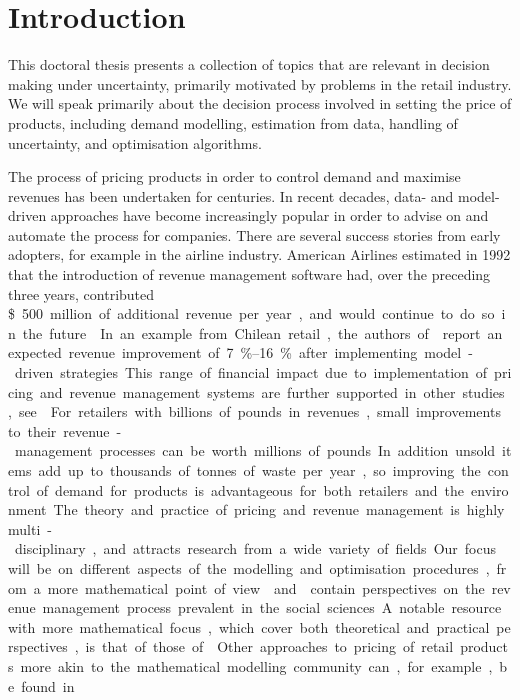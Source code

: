 \documentclass[main.tex]{subfiles}
\begin{document}
\chapter{Introduction}
This doctoral thesis presents a collection of topics that are relevant
in decision making under uncertainty, primarily motivated by
problems in the retail industry.
We will speak primarily about the decision process involved in setting the
price of products, including demand modelling, estimation from data,
handling of uncertainty, and optimisation algorithms.

The process of pricing products in order to control demand and
maximise revenues has been undertaken for centuries. In recent
decades, data- and model-driven approaches have become increasingly
popular in order to advise on and automate the process for companies.
There are several success stories from early adopters, for example in
the airline industry.
American Airlines estimated in 1992 that the introduction of revenue
management software had, over the preceding three
years, contributed \SI{500}[\$] million of additional revenue per year,
and would continue to do so in the future~\cite{smith1992yield}.
In an example from Chilean retail, the authors of~\cite{bitran1998coordinating}
report an expected revenue improvement of \SIrange{7}{16}{\percent} after implementing
model-driven strategies.
This range of financial impact due to implementation of pricing and revenue
management systems are further supported in other studies, see \cite[Ch.~1.2]{phillips2005pricing}.
For retailers with billions of pounds in revenues, small
improvements to their revenue-management processes can be worth millions
of pounds.
In addition unsold items add up to thousands of tonnes of waste per year, so
improving the control of demand for products is advantageous
for both retailers and the environment.

The theory and practice of pricing and revenue management is highly
multi-disciplinary, and attracts research from a wide variety of
fields. Our focus will be on different aspects of the modelling and
optimisation procedures, from a more mathematical point of view.
\citet{phillips2005pricing} and \citet{ozer2012oxford} contain perspectives on the
revenue management process prevalent in the social sciences.
A notable resource with more mathematical focus, which
cover both theoretical and practical
perspectives, is that of those of \citet{talluri2006theory}.
Other approaches to pricing of retail products more akin to the
mathematical modelling community can, for example, be found in~\cite{butler2014customer}.
\end{document}
